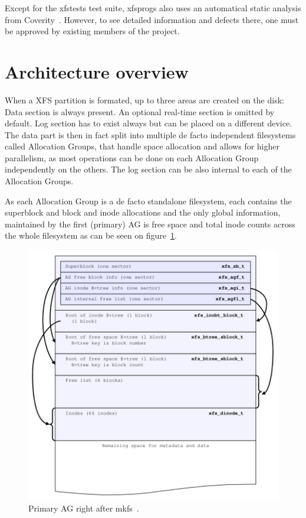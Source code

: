 Except for the xfstests test suite, xfsprogs also uses an automatical static analysis from Coverity~\cite{CoverityXfsprogs}. However, to see detailed information and defects there, one must be approved by existing members of the project.


\section{Architecture overview}\label{chap:xfs:overview}

When a XFS partition is formated, up to three areas are created on the disk: Data section is always present. An optional real-time section is omitted by default. Log section has to exist always but can be placed on a different device. The data part is then in fact split into multiple de facto independent filesystems called Allocation Groups, that handle space allocation and allows for higher parallelism, as most operations can be done on each Allocation Group independently on the others. The log section can be also internal to each of the Allocation Groups.

As each Allocation Group is a de facto standalone filesystem, each contains
the superblock and block and inode allocations and the only global
information, maintained by the first (primary) AG is free space and total
inode counts across the whole filesystem as can be seen
on figure~\ref{fig:xfs:primaryAG}.

\begin{figure}
  \centering
 \includegraphics[width=13cm,keepaspectratio]{fig/primary-ag} %
 \caption{Primary AG right after mkfs~\cite[Ch. 3]{xfsStructure}.}
\label{fig:xfs:primaryAG}
\end{figure}
	
